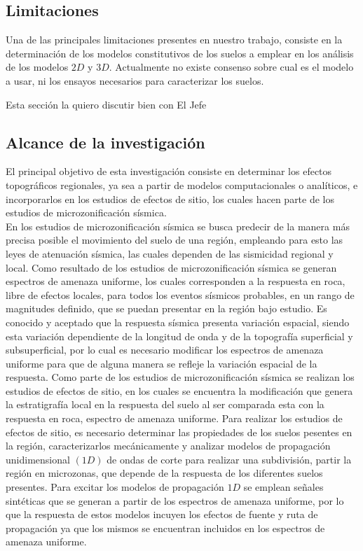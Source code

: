 \documentclass[spanish,letterpaper,12pt,twoside,openany]{article}
\begin{document}
\subsection{Limitaciones}
%
Una de las principales limitaciones presentes en nuestro trabajo, consiste en la determinación de los modelos constitutivos de los suelos a emplear en los análisis de los modelos $2D$ y $3D$. Actualmente no existe consenso sobre cual es el modelo a usar, ni los ensayos necesarios para caracterizar los suelos.

Esta sección la quiero discutir bien con El Jefe
%
%
%
%
%
\subsection{Alcance de la investigación}
%
El principal objetivo de esta investigación consiste en determinar los efectos topográficos regionales, ya sea a partir de modelos computacionales o analíticos, e incorporarlos en los estudios de efectos de sitio, los cuales hacen parte de los estudios de microzonificación sísmica.\\
%
En los estudios de microzonificación sísmica se busca predecir de la manera más precisa posible el movimiento del suelo de una región, empleando para esto las leyes de atenuación sísmica, las cuales dependen de las sismicidad regional y local. Como resultado de los estudios de microzonificación sísmica se generan espectros de amenaza uniforme, los cuales corresponden a la respuesta en roca, libre de efectos locales, para todos los eventos sísmicos probables, en un rango de magnitudes definido, que se puedan presentar en la región bajo estudio. Es conocido y aceptado que la respuesta sísmica presenta variación espacial, siendo esta variación dependiente de la longitud de onda y de la topografía superficial y subsuperficial, por lo cual es necesario modificar los espectros de amenaza uniforme para que de alguna manera se refleje la variación espacial de la respuesta. Como parte de los estudios de microzonificación sísmica se realizan los estudios de efectos de sitio, en los cuales se encuentra la modificación que genera la estratigrafía local en la respuesta del suelo al ser comparada esta con la respuesta en roca, espectro de amenaza uniforme. Para realizar los estudios de efectos de sitio, es necesario determinar las propiedades de los suelos pesentes en la región, caracterizarlos mecánicamente y analizar modelos de propagación unidimensional $\left( 1D \right)$ de ondas de corte para realizar una subdivisión, partir la región en microzonas, que depende de la respuesta de los diferentes suelos presentes. Para excitar los modelos de propagación $1D$ se emplean señales sintéticas que se generan a partir de los espectros de amenaza uniforme, por lo que la respuesta de estos modelos incuyen los efectos de fuente y ruta de propagación ya que los mismos se encuentran incluidos en los espectros de amenaza uniforme.\\
\end{document}
